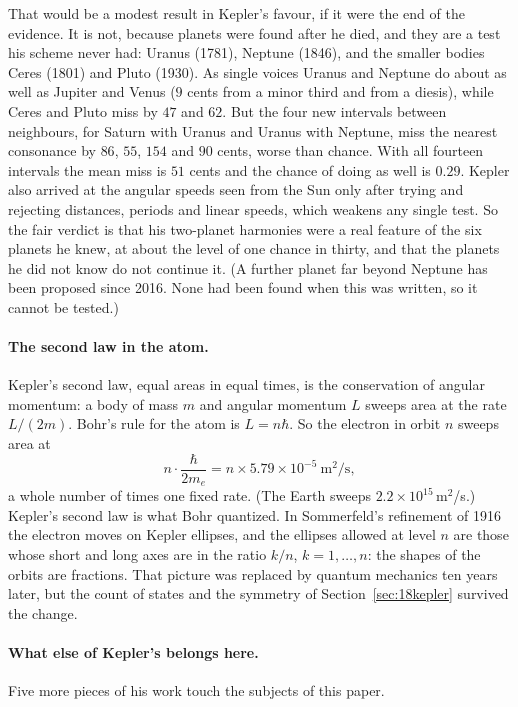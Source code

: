 That would be a modest result in Kepler's favour, if it were the end of the evidence. It is not, because
planets were found after he died, and they are a test his scheme never had: Uranus (1781), Neptune
(1846), and the smaller bodies Ceres (1801) and Pluto (1930). As single voices Uranus and Neptune do
about as well as Jupiter and Venus ($9$ cents from a minor third and from a diesis), while Ceres and
Pluto miss by $47$ and $62$. But the four new intervals between neighbours, for Saturn with Uranus and
Uranus with Neptune, miss the nearest consonance by $86$, $55$, $154$ and $90$ cents, worse than chance.
With all fourteen intervals the mean miss is $51$ cents and the chance of doing as well is $0.29$. Kepler
also arrived at the angular speeds seen from the Sun only after trying and rejecting distances, periods
and linear speeds, which weakens any single test. So the fair verdict is that his two-planet harmonies
were a real feature of the six planets he knew, at about the level of one chance in thirty, and that the
planets he did not know do not continue it. (A further planet far beyond Neptune has been proposed since
2016. None had been found when this was written, so it cannot be tested.)

\paragraph{The second law in the atom.} Kepler's second law, equal areas in equal times, is the
conservation of angular momentum: a body of mass $m$ and angular momentum $L$ sweeps area at the rate
$L/(2m)$. Bohr's rule for the atom is $L=n\hbar$. So the electron in orbit $n$ sweeps area at
\[
  n\cdot\frac{\hbar}{2m_e}=n\times5.79\times10^{-5}\ \text{m}^{2}\text{/s},
\]
a whole number of times one fixed rate. (The Earth sweeps $2.2\times10^{15}$\,m$^{2}$/s.) Kepler's second
law is what Bohr quantized. In Sommerfeld's refinement of 1916 \cite{sommerfeld1916} the electron moves on
Kepler ellipses, and the ellipses allowed at level $n$ are those whose short and long axes are in the
ratio $k/n$, $k=1,\ldots,n$: the shapes of the orbits are fractions. That picture was replaced by quantum
mechanics ten years later, but the count of states and the symmetry of
Section~\ref{sec:18kepler} survived the change.

\paragraph{What else of Kepler's belongs here.} Five more pieces of his work touch the subjects of this
paper.

